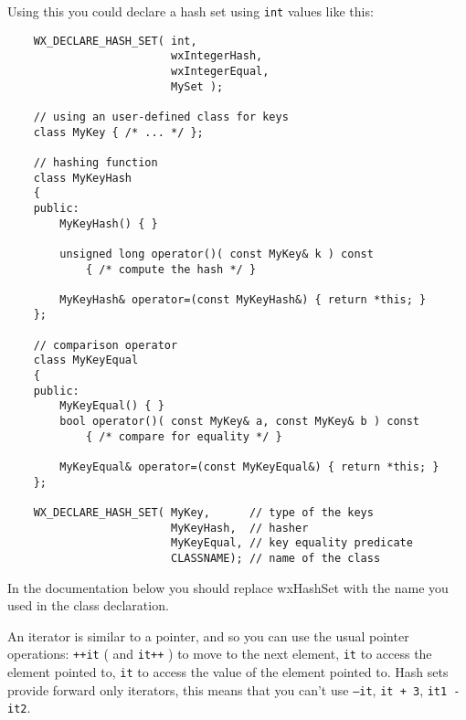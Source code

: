 Using this you could declare a hash set using {\tt int} values like this:

\begin{verbatim}
    WX_DECLARE_HASH_SET( int,
                         wxIntegerHash,
                         wxIntegerEqual,
                         MySet );

    // using an user-defined class for keys
    class MyKey { /* ... */ };

    // hashing function
    class MyKeyHash
    {
    public:
        MyKeyHash() { }

        unsigned long operator()( const MyKey& k ) const
            { /* compute the hash */ }

        MyKeyHash& operator=(const MyKeyHash&) { return *this; }
    };

    // comparison operator
    class MyKeyEqual
    {
    public:
        MyKeyEqual() { }
        bool operator()( const MyKey& a, const MyKey& b ) const
            { /* compare for equality */ }

        MyKeyEqual& operator=(const MyKeyEqual&) { return *this; }
    };

    WX_DECLARE_HASH_SET( MyKey,      // type of the keys
                         MyKeyHash,  // hasher
                         MyKeyEqual, // key equality predicate
                         CLASSNAME); // name of the class
\end{verbatim}


In the documentation below you should replace wxHashSet with the name
you used in the class declaration.

\begin{twocollist}
\end{twocollist}


An iterator is similar to a pointer, and so you can use the usual pointer
operations: {\tt ++it} ( and {\tt it++} ) to move to the next element,
{\tt *it} to access the element pointed to, {\tt *it}
to access the value of the element pointed to.
Hash sets provide forward only iterators, this
means that you can't use {\tt --it}, {\tt it + 3}, {\tt it1 - it2}.

